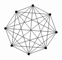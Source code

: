 \[
\begin{tikzpicture}[x=0.01cm,y=0.01cm]
  \draw (275,330) -- (359,286);
  \draw (275,330) -- (390,198);
  \draw (275,330) -- (338,120);
  \draw (275,330) -- (255,90);
  \draw (275,330) -- (172,132);
  \draw (275,330) -- (141,217);
  \draw (275,330) -- (194,299);
  \draw (359,286) -- (390,198);
  \draw (359,286) -- (338,120);
  \draw (359,286) -- (255,90);
  \draw (359,286) -- (172,132);
  \draw (359,286) -- (141,217);
  \draw (359,286) -- (194,299);
  \draw (390,198) -- (338,120);
  \draw (390,198) -- (255,90);
  \draw (390,198) -- (172,132);
  \draw (390,198) -- (141,217);
  \draw (390,198) -- (194,299);
  \draw (338,120) -- (255,90);
  \draw (338,120) -- (172,132);
  \draw (338,120) -- (141,217);
  \draw (338,120) -- (194,299);
  \draw (255,90) -- (172,132);
  \draw (255,90) -- (141,217);
  \draw (255,90) -- (194,299);
  \draw (172,132) -- (141,217);
  \draw (172,132) -- (194,299);
  \draw (141,217) -- (194,299);
  \draw[black,fill=black] (275,330) circle (5);
  \draw[black,fill=black] (359,286) circle (5);
  \draw[black,fill=black] (390,198) circle (5);
  \draw[black,fill=black] (338,120) circle (5);
  \draw[black,fill=black] (255,90) circle (5);
  \draw[black,fill=black] (172,132) circle (5);
  \draw[black,fill=black] (141,217) circle (5);
  \draw[black,fill=black] (194,299) circle (5);
\end{tikzpicture}
\]
